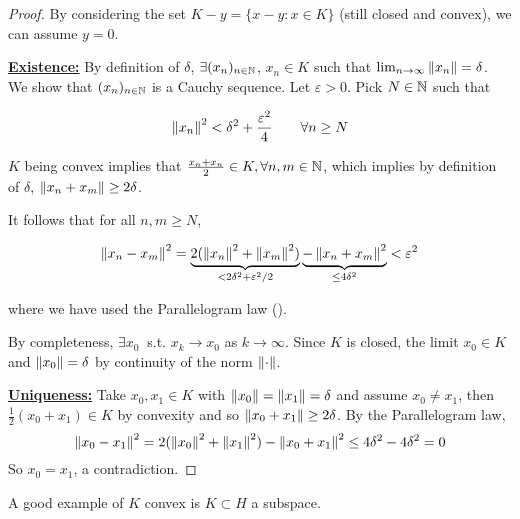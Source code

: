 \documentclass{article}
\begin{document}
\begin{proof}
	By considering the set $K-y = \{x-y: x\in K\}$ (still closed and convex), we can assume $y=0$.

	\underline{\textbf{Existence:}}\nl
	By definition of $\delta$, $\exists (x_n)_{n \in \mathbb{N}}$, $x_n\in K$ such that $\lim_{n \to \infty} \left\|{x_n}\right\|=\delta$. We show that $(x_n)_{n \in \mathbb{N}}$ is a Cauchy sequence. Let $\varepsilon >0$. Pick $N \in \mathbb{N}$ such that

	$$
		\left\|{x_n}\right\|^2 < \delta^2 + \frac{\varepsilon^2}{4} \qquad \forall n \geq N
	$$

	$K$ being convex implies that $\frac{x_n+x_n}{2} \in K, \forall n,m \in \mathbb{N}$, which implies by definition of $\delta$, $\left\|{x_n+x_m}\right\| \geq 2\delta$.

	It follows that for all $n,m \geq N$,

	\begin{equation*}
		\left\|{x_n-x_m}\right\|^2 = \underbrace{2(\left\|{x_n}\right\|^2+\left\|{x_m}\right\|^2)}_{< 2\delta^2 + \varepsilon^2 /2} \underbrace{-\left\|{x_n+x_m}\right\|^2}_{\leq 4\delta^2} < \varepsilon^2
	\end{equation*}

	where we have used the Parallelogram law ().

	By completeness, $\exists x_0 \ $ s.t. $x_k \to x_0$ as $k \to \infty$. Since $K$ is closed, the limit $x_0\in K$ and $\left\|{x_0}\right\|=\delta$ by continuity of the norm $\left\|{\cdot}\right\|$.

	\underline{\textbf{Uniqueness:}}\nl
	Take $x_0, x_1 \in K$ with $\left\|{x_0}\right\|=\left\|{x_1}\right\|=\delta$ and assume $x_0\neq x_1$, then $\frac{1}{2}(x_0+x_1) \in K$ by convexity and so $\left\|{x_0+x_1}\right\|\geq 2\delta$. By the Parallelogram law,
	$$
		\left\|{x_0-x_1}\right\|^2 = 2(\left\|{x_0}\right\|^2 + \left\|{x_1}\right\|^2) - \left\|{x_0+x_1}\right\|^2 \leq 4\delta^2-4\delta^2= 0
	$$
	So $x_0=x_1$, a contradiction.
\end{proof}

\begin{remark}
	A good example of $K$ convex is $K \subset H$ a subspace.
\end{remark}
\end{document}
